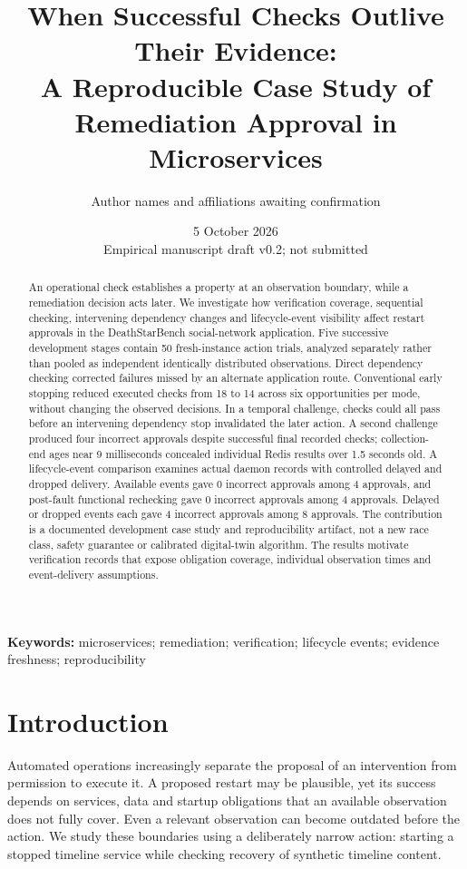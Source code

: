 \documentclass[11pt]{article}
\title{When Successful Checks Outlive Their Evidence:\\A Reproducible Case Study of Remediation Approval in Microservices}
\author{Author names and affiliations awaiting confirmation}
\date{5 October 2026\\Empirical manuscript draft v0.2; not submitted}
\begin{document}
\maketitle
\begin{abstract}
An operational check establishes a property at an observation boundary, while a remediation decision acts later. We investigate how verification coverage, sequential checking, intervening dependency changes and lifecycle-event visibility affect restart approvals in the DeathStarBench social-network application. Five successive development stages contain 50 fresh-instance action trials, analyzed separately rather than pooled as independent identically distributed observations. Direct dependency checking corrected failures missed by an alternate application route. Conventional early stopping reduced executed checks from 18 to 14 across six opportunities per mode, without changing the observed decisions. In a temporal challenge, checks could all pass before an intervening dependency stop invalidated the later action. A second challenge produced four incorrect approvals despite successful final recorded checks; collection-end ages near 9 milliseconds concealed individual Redis results over 1.5 seconds old. A lifecycle-event comparison examines actual daemon records with controlled delayed and dropped delivery. Available events gave 0 incorrect approvals among 4 approvals, and post-fault functional rechecking gave 0 incorrect approvals among 4 approvals. Delayed or dropped events each gave 4 incorrect approvals among 8 approvals. The contribution is a documented development case study and reproducibility artifact, not a new race class, safety guarantee or calibrated digital-twin algorithm. The results motivate verification records that expose obligation coverage, individual observation times and event-delivery assumptions.
\end{abstract}
\noindent\textbf{Keywords:} microservices; remediation; verification; lifecycle events; evidence freshness; reproducibility

\section{Introduction}
Automated operations increasingly separate the proposal of an intervention from permission to execute it. A proposed restart may be plausible, yet its success depends on services, data and startup obligations that an available observation does not fully cover. Even a relevant observation can become outdated before the action. We study these boundaries using a deliberately narrow action: starting a stopped timeline service while checking recovery of synthetic timeline content.
\end{document}
